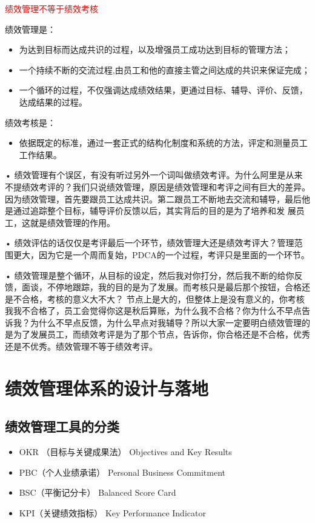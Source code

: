 \documentclass[12pt]{article}
\begin{document}
\textcolor{red}{绩效管理不等于绩效考核}

绩效管理是：
\begin{itemize}
\setlength{\itemsep}{0pt}
\setlength{\parsep}{0pt}
\setlength{\parskip}{0pt}
    \item 为达到目标而达成共识的过程，以及增强员工成功达到目标的管理方法；
    \item 一个持续不断的交流过程,由员工和他的直接主管之间达成的共识来保证完成；
    \item 一个循环的过程，不仅强调达成绩效结果，更通过目标、辅导、评价、反馈，达成结果的过程。
\end{itemize}

绩效考核是：
\begin{itemize}
\setlength{\itemsep}{0pt}
\setlength{\parsep}{0pt}
\setlength{\parskip}{0pt}
    \item 依据既定的标准，通过一套正式的结构化制度和系统的方法，评定和测量员工工作结果。
\end{itemize}

• 绩效管理有个误区，有没有听过另外一个词叫做绩效考评。为什么阿里是从来不提绩效考评的？我们只说绩效管理，原因是绩效管理和考评之间有巨大的差异。 因为绩效管理，首先要跟员工达成共识。第二跟员工不断地去交流和辅导，最后他是通过追踪整个目标，辅导评价反馈以后，其实背后的目的是为了培养和发 展员工，这就是绩效管理的作用。

• 绩效评估的话仅仅是考评最后一个环节，绩效管理大还是绩效考评大？管理范围更大，因为它是一个周而复始，PDCA的一个过程，考评只是里面的一个环节。

• 绩效管理是整个循环，从目标的设定，然后我对你打分，然后我不断的给你反馈，面谈，不停地跟踪，我的目的是为了发展。而考核只是最后那个按钮，合格还是不合格，考核的意义大不大？ 节点上是大的，但整体上是没有意义的，你考核我我不合格了，员工会觉得你这是秋后算账，为什么我不合格？你为什么不早点告诉我？为什么不早点反馈，为什么早点对我辅导？所以大家一定要明白绩效管理的是为了发展员工，而绩效考评是为了那个节点，告诉你，你合格还是不合格，优秀还是不优秀。绩效管理不等于绩效考评。

\section{绩效管理体系的设计与落地}
\subsection{绩效管理工具的分类}
\begin{itemize}
\setlength{\itemsep}{0pt}
\setlength{\parsep}{0pt}
\setlength{\parskip}{0pt}
    \item OKR （目标与关键成果法） Objectives and Key Results
    \item PBC（个人业绩承诺） Personal Business Commitment
    \item BSC（平衡记分卡） Balanced Score Card
    \item KPI（关键绩效指标） Key Performance Indicator
\end{itemize}
\end{document}
